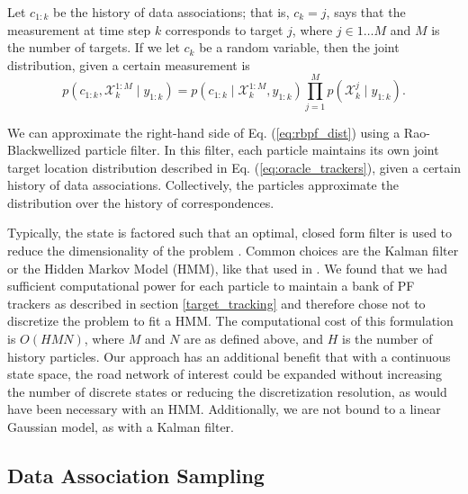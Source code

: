 \documentclass[letterpaper, 10 pt, conference]{ieeeconf}  %
\begin{document}
Let $c_{1:k}$ be the history of data associations; that is, $c_k = j$, says that the measurement at time step $k$ corresponds to target $j$, where $j \in 1 \ldots M$ and $M$ is the number of targets. If we let $c_k$ be a random variable, then the joint distribution, given a certain measurement is
\begin{equation}\label{eq:rbpf_dist}
    p(c_{1:k}, \mathcal{X}^{1:M}_{k} \mid y_{1:k}) = p(c_{1:k} \mid \mathcal{X}^{1:M}_{k}, y_{1:k}) \prod_{j=1}^M p(\mathcal{X}^{j}_{k} \mid y_{1:k}).
\end{equation}

We can approximate the right-hand side of Eq. (\ref{eq:rbpf_dist}) using a Rao-Blackwellized particle filter. In this filter, each particle maintains its own joint target location distribution described in Eq. (\ref{eq:oracle_trackers}), given a certain history of data associations. Collectively, the particles approximate the distribution over the history of correspondences.

Typically, the state is factored such that an optimal, closed form filter is used to reduce the dimensionality of the problem \cite{Doucet2000a}. Common choices are the Kalman filter or the Hidden Markov Model (HMM), like that used in \cite{Ahmed2017}. We found that we had sufficient computational power for each particle to maintain a bank of PF trackers as described in section \ref{target_tracking} and therefore chose not to discretize the problem to fit a HMM. The computational cost of this formulation is $O(HMN)$, where $M$ and $N$ are as defined above, and $H$ is the number of history particles. Our approach has an additional benefit that with a continuous state space, the road network of interest could be expanded without increasing the number of discrete states or reducing the discretization resolution, as would have been necessary with an HMM. Additionally, we are not bound to a linear Gaussian model, as with a Kalman filter.

\subsection{Data Association Sampling}\label{data_association_sampling}
\end{document}
